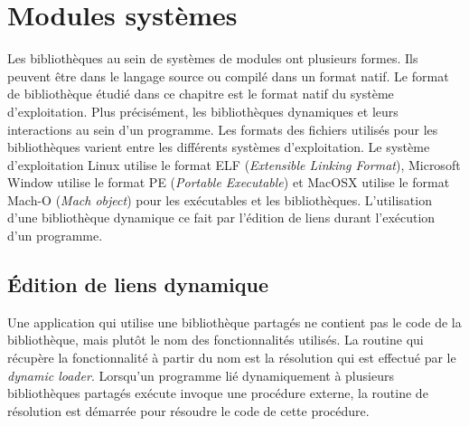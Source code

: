 \chapter{Modules systèmes}
\label{ch:module_systems}




Les bibliothèques au sein de systèmes de modules ont plusieurs formes.  Ils
peuvent être dans le langage source ou compilé dans un format natif. Le format
de bibliothèque étudié dans ce chapitre est le format natif du système
d'exploitation. Plus précisément, les bibliothèques dynamiques et leurs
interactions au sein d'un programme. Les formats des fichiers utilisés pour
les bibliothèques varient entre les différents systèmes d'exploitation.
Le système d'exploitation Linux utilise le format ELF (\textit{Extensible Linking
Format}), Microsoft Window utilise le format PE (\textit{Portable Executable})
et MacOSX utilise le format Mach-O (\textit{Mach object}) pour les exécutables
et les bibliothèques. L'utilisation d'une bibliothèque dynamique ce fait par
l'édition de liens durant l'exécution d'un programme.



\section{Édition de liens dynamique}

Une application qui utilise une bibliothèque partagés ne contient pas le code
de la bibliothèque, mais plutôt le nom des fonctionnalités utilisés.  La
routine qui récupère la fonctionnalité à partir du nom est la
résolution qui est effectué par le \textit{dynamic loader}.  Lorsqu'un
programme lié dynamiquement à plusieurs bibliothèques partagés exécute invoque
une procédure externe, la routine de résolution est démarrée pour résoudre le
code de cette procédure.

